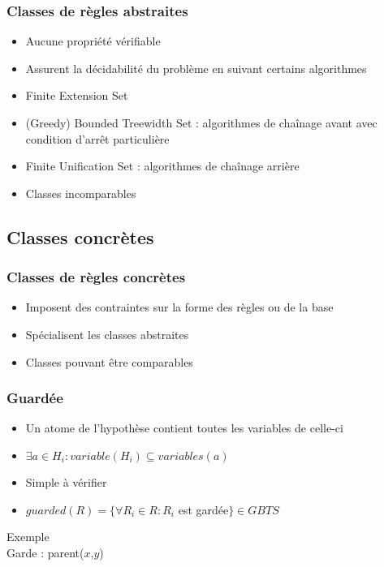 \begin{frame}[t]
	\frametitle{Classes de règles abstraites}
	\vspace{10mm}
	\begin{itemize}
		\item Aucune propriété vérifiable
		\item Assurent la décidabilité du problème en suivant certains algorithmes
		\item Finite Extension Set
		\item (Greedy) Bounded Treewidth Set : algorithmes de chaînage avant avec condition
			d'arrêt particulière
		\item Finite Unification Set : algorithmes de chaînage arrière
		\item Classes incomparables
	\end{itemize}
\end{frame}


\subsection{Classes concrètes}

\begin{frame}
	\frametitle{Classes de règles concrètes}
	\vspace{10mm}
	\begin{itemize}
		\item Imposent des contraintes sur la forme des règles ou de la base
		\item Spécialisent les classes abstraites
		\item Classes pouvant être comparables
	\end{itemize}
\end{frame}

\begin{frame}
	\frametitle{Guardée}
	\begin{itemize}
		\item Un atome de l'hypothèse contient toutes les variables de celle-ci
		\item $\exists a \in H_i : variable(H_i) \subseteq variables(a)$
		\item Simple à vérifier
		\item $guarded(R) = \{\forall R_i \in R : R_i $ est gardée$\} \in GBTS$
	\end{itemize}
	\vspace{10mm}
	\begin{exampleblock}{Exemple}
		 \\
		Garde : parent($x$,$y$)
	\end{exampleblock}
\end{frame}

